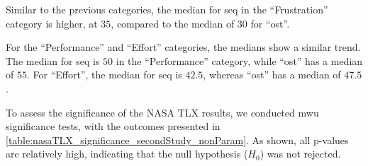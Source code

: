 Similar to the previous categories, the median for \gls{seq} in the \enquote{Frustration} category is higher, at $35$, compared to the median of $30$ for \enquote{ost}.

For the \enquote{Performance} and \enquote{Effort} categories, the medians show a similar trend. The median for \gls{seq} is $50$ in the \enquote{Performance} category, while \enquote{ost} has a median of $55$. For \enquote{Effort}, the median for \gls{seq} is $42.5$, whereas \enquote{ost} has a median of $47.5$.



To assess the significance of the NASA TLX results, we conducted \gls{mwu} significance tests, with the outcomes presented in \autoref{table:nasaTLX_significance_secondStudy_nonParam}. As shown, all p-values are relatively high, indicating that the null hypothesis ($H_0$) was not rejected.


